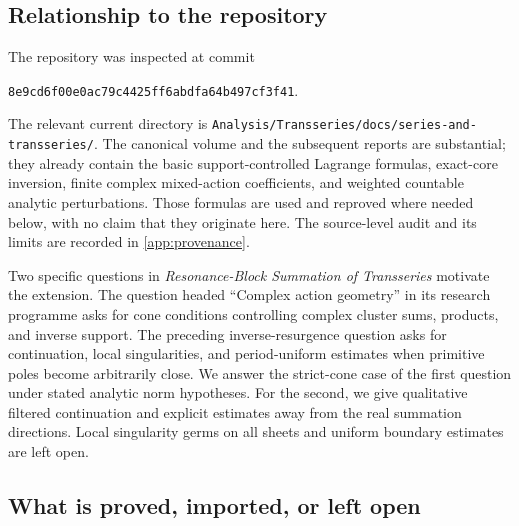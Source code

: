 \documentclass[11pt,a4paper]{article}
\numberwithin{equation}{section}
\theoremstyle{definition}
\theoremstyle{remark}
\begin{document}
\subsection{Relationship to the repository}

The repository was inspected at commit
\begin{center}
\texttt{8e9cd6f00e0ac79c4425ff6abdfa64b497cf3f41}.
\end{center}
The relevant current directory is
\texttt{Analysis/Transseries/docs/series-and-transseries/}.
The canonical volume and the subsequent reports are substantial; they already
contain the basic support-controlled Lagrange formulas, exact-core inversion,
finite complex mixed-action coefficients, and weighted countable analytic
perturbations. Those formulas are used and reproved where needed below, with no
claim that they originate here. The source-level audit and its limits are recorded
in \cref{app:provenance}.

Two specific questions in \emph{Resonance-Block Summation of Transseries}
\cite{repo-resonance} motivate the extension. The question headed ``Complex action
geometry'' in its research programme asks for cone conditions controlling complex
cluster sums, products, and inverse support. The preceding inverse-resurgence
question asks for continuation, local singularities, and period-uniform estimates
when primitive poles become arbitrarily close. We answer the strict-cone case of
the first question under stated analytic norm hypotheses. For the second, we give
qualitative filtered continuation and explicit estimates away from the real
summation directions. Local singularity germs on all sheets and uniform boundary
estimates are left open.

\subsection{What is proved, imported, or left open}
\end{document}
